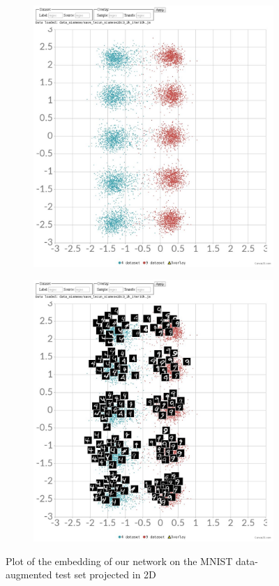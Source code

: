 \documentclass[a4paper,12pt]{report}
\begin{document}
\begin{figure}[t!]
    \centering
    \begin{subfigure}[t]{0.75\textwidth}
        \centering
        \includegraphics{thesis_figures/mnist_cl2d.jpg}
    \end{subfigure}
    \begin{subfigure}[t]{0.75\textwidth}
        \centering
        \includegraphics{thesis_figures/mnist_cl2d2.jpg}
    \end{subfigure}
    \label{fig:mnist_cl2d}
    \caption{Plot of the embedding of our network on the MNIST data-augmented test set projected in 2D}
\end{figure}
\end{document}
